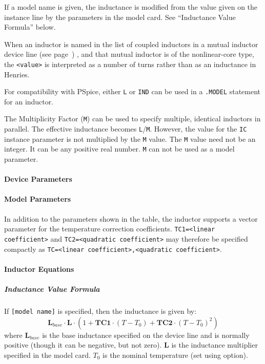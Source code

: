 \begin{Device}
If a model name is given, the inductance is modified from the value
given on the instance line by the parameters in the model card.  See
``Inductance Value Formula'' below.

When an inductor is named in the list of coupled inductors in a mutual
inductor device line (see page~\pageref{MutualInductor}) , and that
mutual inductor is of the nonlinear-core type, the \verb+<value>+ is
interpreted as a number of turns rather than as an inductance in
Henries.

For compatibility with PSpice, either \texttt{L} or \texttt{IND} can be used in a
\texttt{.MODEL} statement for an inductor. 

The Multiplicity Factor (\texttt{M}) can be used to specify multiple, identical 
inductors in parallel. The effective inductance becomes \texttt{L}/\texttt{M}.
However, the value for the \texttt{IC} instance parameter is not multiplied by 
the \texttt{M} value. The \texttt{M} value need not be an integer.  It can be 
any positive real number. \texttt{M} can not be used as a model parameter.

\end{Device}

\newpage

\paragraph{Device Parameters}


\paragraph{Model Parameters}


In addition to the parameters shown in the table, the inductor supports a vector parameter for the temperature correction coefficients.  \texttt{TC1=<linear coefficient>} and \texttt{TC2=<quadratic coefficient>} may therefore be specified compactly as \texttt{TC=<linear coefficient>,<quadratic coefficient>}.

\paragraph{Inductor Equations}

\subparagraph{Inductance Value Formula}
If \verb+[model name]+ is specified, then the inductance is given by:
\[\mathbf{L}_{base} \cdot \mathbf{L} \cdot (1 + \mathbf{TC1} \cdot (T - T_{0}) +
\mathbf{TC2} \cdot (T - T_{0})^{2})\]
where \texttt{$\mathbf{L}_{base}$} is the base inductance specified on the device line and is normally positive (though it can be
negative, but not zero).  $\mathbf{L}$ is the inductance multiplier specified in the model card.  $T_0$ is the nominal temperature (set using
 option).

